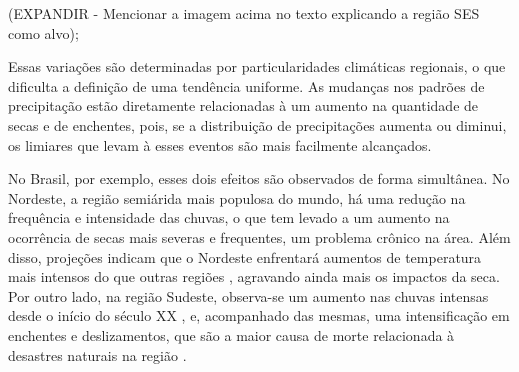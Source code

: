 (EXPANDIR - Mencionar a imagem acima no texto explicando a região SES como alvo);

Essas variações são determinadas por particularidades climáticas regionais, o que dificulta a definição de uma tendência
uniforme. As mudanças nos padrões de precipitação estão diretamente relacionadas à um aumento na quantidade de secas e
de enchentes, pois, se a distribuição de precipitações aumenta ou diminui, os limiares que levam à esses eventos são
mais facilmente alcançados.

No Brasil, por exemplo, esses dois efeitos são observados de forma simultânea. No Nordeste, a região semiárida mais
populosa do mundo, há uma redução na frequência e intensidade das chuvas, o que tem levado a um aumento na ocorrência de
secas mais severas e frequentes, um problema crônico na área. Além disso, projeções indicam que o Nordeste enfrentará
aumentos de temperatura mais intensos do que outras regiões \cite{hoegh-guldberg}, agravando ainda mais os impactos da
seca. Por outro lado, na região Sudeste, observa-se um aumento nas chuvas intensas desde o início do século XX
\cite{dunn}, e, acompanhado das mesmas, uma intensificação em enchentes e deslizamentos, que são a maior causa de morte
relacionada à desastres naturais na região \cite{ufsc}. 
